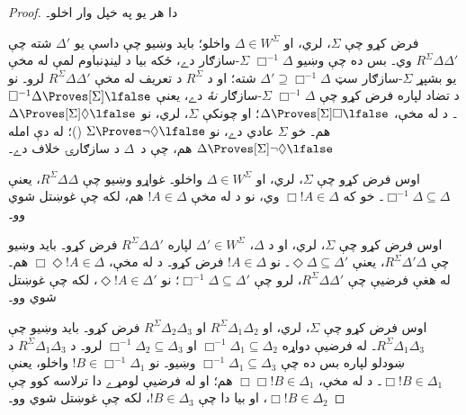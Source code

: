 \documentclass[../../../include/open-logic-section]{subfiles}
\begin{document}
\begin{proof}
  دا هر يو په خپل وار اخلو۔

  فرض کړو چې $\Sigma$،  لري، او $\Delta \in W^\Sigma$ واخلو؛ بايد
  وښيو چې داسې يو $\Delta'$ شته چې $R^\Sigma
  \Delta\Delta'$ وي۔ بس ده چې وښيو $\Box^{-1}\Delta$
  $\Sigma$-سازګار دے، ځکه بيا د لينډنباوم لمې له مخې يو
  بشپړ $\Sigma$-سازګار سټ $\Delta' \supseteq
  \Box^{-1}\Delta$ شته؛ او د $R^\Sigma$ د تعريف
  له مخې
  $R^\Sigma \Delta\Delta'$ لرو۔ نو د تضاد لپاره فرض کړو چې
  $\Box^{-1}\Delta$ $\Sigma$-سازګار \emph{نۀ} دے، يعنې
  $\Box^{-1}\Delta \Proves[\Sigma] \lfalse$۔ د  له مخې،
  $\Delta \Proves[\Sigma] \Box\lfalse$؛ او چونکې $\Sigma$،
   لري، نو $\Delta \Proves[\Sigma] \Diamond\lfalse$ هم۔ خو $\Sigma$
  عادي دے، نو $\Sigma \Proves \lnot\Diamond \lfalse$
  ()؛ له دې امله $\Delta
  \Proves[\Sigma] \lnot\Diamond \lfalse$ هم، چې د~$\Delta$
  د سازګارۍ خلاف دے۔

  اوس فرض کړو چې $\Sigma$،  لري، او $\Delta \in
  W^\Sigma$ واخلو۔ غواړو وښيو چې $R^\Sigma \Delta\Delta$،
  يعنې
  $\Box^{-1}\Delta \subseteq \Delta$۔ خو که $\Box!A \in \Delta$ وي، نو
  د  له مخې $!A \in \Delta$ هم، لکه چې غوښتل شوي وو۔

  اوس فرض کړو چې $\Sigma$،  لري، او د $\Delta$، $\Delta' \in W^\Sigma$
  لپاره $R^\Sigma \Delta\Delta'$ فرض کړو۔ بايد وښيو
  چې $R^\Sigma \Delta'\Delta$، يعنې
  $\Diamond\Delta \subseteq \Delta'$۔ نو $!A \in \Delta$ فرض کړو۔ د
   له مخې، $\Box\Diamond!A \in \Delta$ هم۔ له هغې فرضيې چې
  $R^\Sigma \Delta\Delta'$، لرو چې $\Box^{-1}\Delta
  \subseteq \Delta'$؛ نو $\Diamond!A \in \Delta'$، لکه چې غوښتل شوي وو۔

  اوس فرض کړو چې $\Sigma$،  لري، او $R^\Sigma
  \Delta_1\Delta_2$ او $R^\Sigma \Delta_2\Delta_3$ فرض کړو۔ بايد وښيو
  چې $R^\Sigma \Delta_1\Delta_3$۔ له فرضيې دواړه $\Box^{-1}\Delta_1
  \subseteq \Delta_2$ او $\Box^{-1}\Delta_2 \subseteq \Delta_3$ لرو۔ د
  $R^\Sigma \Delta_1\Delta_3$ د ښودلو لپاره بس ده چې
  $\Box^{-1}\Delta_1 \subseteq \Delta_3$ وښيو۔ نو $!B \in
  \Box^{-1}\Delta_1$ واخلو، يعنې $\Box!B \in \Delta_1$۔ د  له مخې،
  $\Box\Box!B \in \Delta_1$ هم؛ او له فرضيې لومړے دا ترلاسه کوو چې
  $\Box!B \in \Delta_2$، او بيا دا چې $!B \in \Delta_3$، لکه چې
  غوښتل شوي وو۔


\end{proof}
\end{document}
